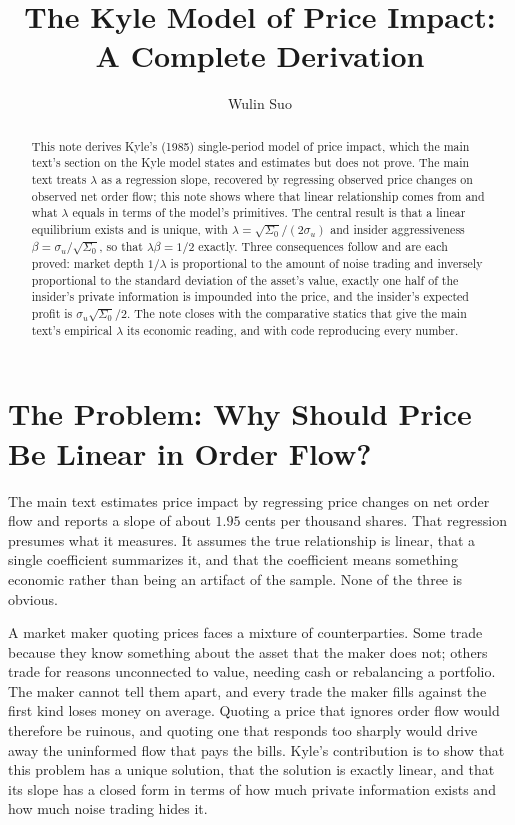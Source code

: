 \documentclass[11pt]{article}
\title{The Kyle Model of Price Impact:\\ A Complete Derivation}
\author{Wulin Suo}
\date{}
\theoremstyle{remark}
\theoremstyle{definition}
\begin{document}
\maketitle

\begin{abstract}
\noindent This note derives Kyle's (1985) single-period model of price impact, which the main text's section on the Kyle model states and estimates but does not prove. The main text treats $\lambda$ as a regression slope, recovered by regressing observed price changes on observed net order flow; this note shows where that linear relationship comes from and what $\lambda$ equals in terms of the model's primitives. The central result is that a linear equilibrium exists and is unique, with $\lambda = \sqrt{\Sigma_0}/(2\sigma_u)$ and insider aggressiveness $\beta = \sigma_u/\sqrt{\Sigma_0}$, so that $\lambda\beta = 1/2$ exactly. Three consequences follow and are each proved: market depth $1/\lambda$ is proportional to the amount of noise trading and inversely proportional to the standard deviation of the asset's value, exactly one half of the insider's private information is impounded into the price, and the insider's expected profit is $\sigma_u\sqrt{\Sigma_0}/2$. The note closes with the comparative statics that give the main text's empirical $\lambda$ its economic reading, and with code reproducing every number.
\end{abstract}

\section{The Problem: Why Should Price Be Linear in Order Flow?}
\label{sec:problem}

The main text estimates price impact by regressing price changes on net order flow and reports a slope of about $1.95$ cents per thousand shares. That regression presumes what it measures. It assumes the true relationship is linear, that a single coefficient summarizes it, and that the coefficient means something economic rather than being an artifact of the sample. None of the three is obvious.

A market maker quoting prices faces a mixture of counterparties. Some trade because they know something about the asset that the maker does not; others trade for reasons unconnected to value, needing cash or rebalancing a portfolio. The maker cannot tell them apart, and every trade the maker fills against the first kind loses money on average. Quoting a price that ignores order flow would therefore be ruinous, and quoting one that responds too sharply would drive away the uninformed flow that pays the bills. Kyle's contribution is to show that this problem has a unique solution, that the solution is exactly linear, and that its slope has a closed form in terms of how much private information exists and how much noise trading hides it.
\end{document}
